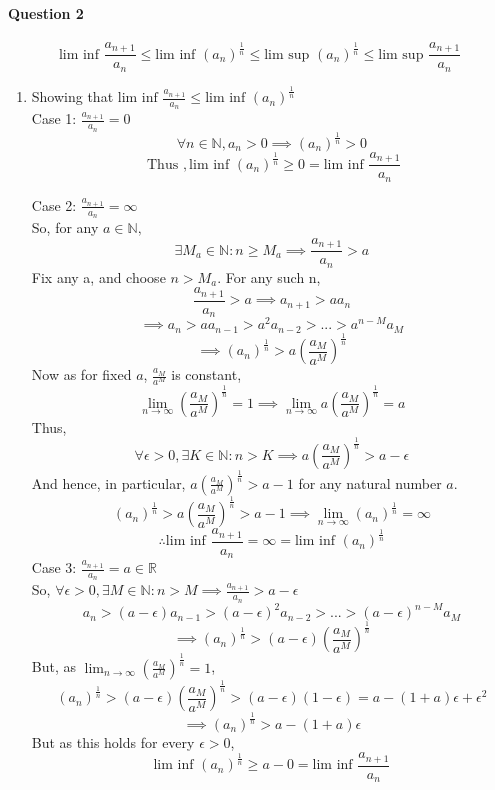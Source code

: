 \documentclass[20pt]{extarticle} %
\begin{document}
\paragraph{Question 2}
\[ \text{lim inf } \frac{a_{n+1}}{a_n} \leq \text{lim inf }(a_n)^\frac{1}{n} \leq \text{lim sup }(a_n)^\frac{1}{n} \leq \text{lim sup }\frac{a_{n+1}}{a_n} \]
\begin{enumerate}[label=\Roman*]
	\item Showing that $\text{lim inf } \frac{a_{n+1}}{a_n} \leq \text{lim inf }(a_n)^\frac{1}{n}$\\
		Case 1:  $ \frac{a_{n+1}}{a_n}=0 $
		\[ \forall n \in \mathbb{N}, a_n > 0 \implies (a_n)^ \frac{1}{n}> 0 \]
		\[ \text{ Thus } , \text{lim inf }(a_n)^ \frac{1}{n} \geq 0 = \text{lim inf } \frac{a_{n+1}}{a_n} 	 \]

		Case 2:  $ \frac{a_{n+1}}{a_n}= \infty $\\
		So, for any $ a \in \mathbb{N},$
		\[ \exists M_a \in \mathbb{N}: n\geq	M_a \implies \frac{a_{n+1}}{a_n}> a \]
		Fix any a, and choose $n>M_a$. For any such n,
		\[  \frac{a_{n+1}}{a_n}>a \implies a_{n+1} >aa_n  \]
		\[ \implies a_n>aa_{n-1}> a^2a_{n-2}>...>a^{n-M}a_M \]
		\[ \implies  (a_n)^ \frac{1}{n} > a( \frac{a_M}{a^M} )^	\frac{1}{n} \]
		Now as for fixed $a$, $ \frac{a_M}{a^M} $ is constant,
		\[ \lim_{n \to \infty} (\frac{a_M}{a^M})^{ \frac{1}{n} }=1 \implies \lim_{n \to \infty} a(\frac{a_M}{a^M})^{ \frac{1}{n} }=a\]
		Thus, \[\forall \epsilon >0, \exists K \in \mathbb{N}: n>K \implies a(\frac{a_M}{a^M})^{ \frac{1}{n} }>a- \epsilon \]
		And hence, in particular, $a(\frac{a_M}{a^M})^{ \frac{1}{n} }>a-1$ for any natural number $a$.
		\[ (a_n)^ \frac{1}{n}  > a(\frac{a_M}{a^M})^{ \frac{1}{n} }> a-1 \implies \lim_{n \to \infty} (a_n)^ \frac{1}{n}= \infty  \]
		\[ \therefore  \text{lim inf } \frac{a_{n+1}}{a_n} = \infty=\text{lim inf }(a_n)^\frac{1}{n}\]
		Case 3:  $ \frac{a_{n+1}}{a_n}= a \in \mathbb{R} $\\
		So, $ \forall \epsilon > 0,  \exists M \in \mathbb{N}: n > M \implies \frac{a_{n+1}}{a_n} > a-\epsilon$
		\[ a_n>(a-\epsilon) a_{n-1}>(a-\epsilon)^2 a_{n-2}>...>(a-\epsilon)^{n-M} a_M \]
		\[ \implies (a_n)^ \frac{1}{n}>(a- \epsilon) (\frac{a_M}{a^M})^{ \frac{1}{n} }\]
	But, as $\lim_{n \to \infty} (\frac{a_M}{a^M})^ \frac{1}{n}=1 $,\\
	\[ (a_n)^ \frac{1}{n}>(a- \epsilon) (\frac{a_M}{a^M})^{ \frac{1}{n} }>(a-\epsilon)(1-\epsilon)=a-(1+a)\epsilon+ \epsilon^2 \]
	\[ \implies  (a_n)^ \frac{1}{n}>a-(1+a)\epsilon \]
		But as this holds for every $\epsilon >0$,
		\[ \text{lim inf }(a_n)^ \frac{1}{n} \geq a-0= \text{lim inf } \frac{a_{n+1}}{a_n}  \]


\end{enumerate}
\end{document}
